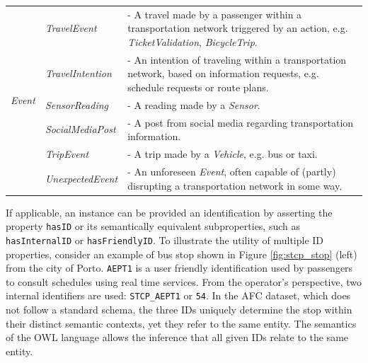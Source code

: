 \documentclass[]{interact}
\theoremstyle{plain}%
\theoremstyle{definition}
\theoremstyle{remark}
\theoremstyle{definition}
\begin{document}
\begin{table}
\begin{tabular}{c|l|p{12cm}}
		\hline
		\multirow{8}{*}{\textit{Event}}	&	\textit{TravelEvent}	& - A travel made by a passenger within a transportation network triggered by an action, e.g. \textit{TicketValidation}, \textit{BicycleTrip}.\\
		&	\textit{TravelIntention}	& - An intention of traveling within a transportation network, based on information requests, e.g. schedule requests or route plans. \\
		&	\textit{SensorReading}		& - A reading made by a \textit{Sensor}. \\
		&	\textit{SocialMediaPost}	& - A post from social media regarding transportation information. \\
		&	\textit{TripEvent}	&	- A trip made by a \textit{Vehicle}, e.g. bus or taxi. \\
		&	\textit{UnexpectedEvent}	& - An unforeseen \textit{Event}, often capable of (partly) disrupting a transportation network in some way. \\
		
		\bottomrule
	\end{tabular}
\end{table}

%
%

If applicable, an instance can be provided an identification by asserting the property \texttt{hasID} or its semantically equivalent subproperties, such as \texttt{hasInternalID} or \texttt{hasFriendlyID}. To illustrate the utility of multiple ID properties, consider an example of bus stop shown in Figure \ref{fig:stcp_stop} (left) from the city of Porto. \texttt{AEPT1} is a user friendly identification used by passengers to consult schedules using real time services. From the operator's perspective, two internal identifiers are used: \texttt{STCP\_AEPT1} or \texttt{54}. In the AFC dataset, which does not follow a standard schema, the three IDs uniquely determine the stop within their distinct semantic contexts, yet they refer to the same entity. The semantics of the OWL language allows the inference that all given IDs relate to the same entity.
\end{document}

